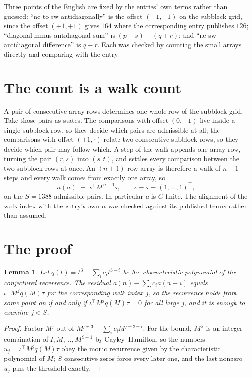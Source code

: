 \documentclass[11pt,a4paper]{article}
\theoremstyle{plain}
\newtheorem{lemma}[theorem]{Lemma}
\theoremstyle{definition}
\begin{document}
Three points of the English are fixed by the entries' own terms rather than guessed:
``ne-to-sw antidiagonally'' is the offset $(+1,-1)$ on the subblock grid, since the offset
$(+1,+1)$ gives $164$ where the corresponding entry publishes $126$; ``diagonal minus
antidiagonal sum'' is $(p+s)-(q+r)$; and ``ne-sw antidiagonal difference'' is $q-r$. Each was
checked by counting the small arrays directly and comparing with the entry.

\section{The count is a walk count}

A pair of consecutive array rows determines one whole row of the subblock grid. Take those
pairs as states. The comparisons with offset $(0,\pm1)$ live inside a single subblock row, so
they decide which pairs are admissible at all; the comparisons with offset $(\pm1,\cdot)$
relate two consecutive subblock rows, so they decide which pair may follow which. A step of the
walk appends one array row, turning the pair $(r,s)$ into $(s,t)$, and settles every comparison
between the two subblock rows at once. An $(n+1)$-row array is therefore a walk of $n-1$ steps
and every walk comes from exactly one array, so
\[
a(n)\;=\;\iota^{\!\top}M^{\,n-1}\tau,\qquad \iota=\tau=(1,\dots,1)^{\!\top},
\]
on the $S=1388$ admissible pairs. In particular $a$ is $C$-finite. The alignment of the walk
index with the entry's own $n$ was checked against its published terms rather than assumed.

\section{The proof}

\begin{lemma}\label{lem:crit}
Let $q(t)=t^{3}-\sum_i c_it^{3-i}$ be the characteristic polynomial of the
conjectured recurrence. The residual $a(n)-\sum_ic_ia(n-i)$ equals
$\iota^{\!\top}M^{\,j}q(M)\tau$ for the corresponding walk index $j$, so the recurrence
holds from some point on if and only if $\iota^{\!\top}M^{j}q(M)\tau=0$ for all large $j$,
and it is enough to examine $j<S$.
\end{lemma}

\begin{proof}
Factor $M^{j}$ out of $M^{j+3}-\sum_ic_iM^{j+3-i}$. For the bound, $M^{S}$
is an integer combination of $I,M,\dots,M^{S-1}$ by Cayley--Hamilton, so the numbers
$u_j=\iota^{\!\top}M^{j}q(M)\tau$ obey the monic recurrence given by the characteristic
polynomial of $M$; $S$ consecutive zeros force every later one, and the last nonzero $u_j$
pins the threshold exactly.
\end{proof}
\end{document}
